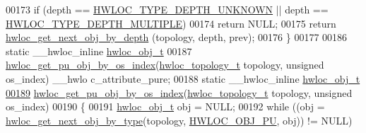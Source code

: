 \begin{DoxyCode}
00173   \textcolor{keywordflow}{if} (depth == \hyperlink{a00046_ggaf4e663cf42bbe20756b849c6293ef575a0565ab92ab72cb0cec91e23003294aad}{HWLOC_TYPE_DEPTH_UNKNOWN} || depth == \hyperlink{a00046_ggaf4e663cf42bbe20756b849c6293ef575ae99465995cacde6c210d5fc2e409798c}{HWLOC_TYPE_DEPTH_MULTIPLE})
00174     \textcolor{keywordflow}{return} NULL;
00175   \textcolor{keywordflow}{return} \hyperlink{a00053_gab7c1dce3f42ece5bfa621e87cf332418}{hwloc_get_next_obj_by_depth} (topology, depth, prev);
00176 \}
00177 
00186 \textcolor{keyword}{static} \_\_hwloc\_inline \hyperlink{a00016}{hwloc_obj_t}
00187 \hyperlink{a00053_ga0bc54225b65d557c70c7cb5dfb714de7}{hwloc_get_pu_obj_by_os_index}(\hyperlink{a00039_ga9d1e76ee15a7dee158b786c30b6a6e38}{hwloc_topology_t} topology, \textcolor{keywordtype}{unsigned} os\_index) \_\_hwlo
      c\_attribute\_pure;
00188 \textcolor{keyword}{static} \_\_hwloc\_inline \hyperlink{a00016}{hwloc_obj_t}
\hypertarget{a00031_source_l00189}{}\hyperlink{a00053_ga0bc54225b65d557c70c7cb5dfb714de7}{00189} \hyperlink{a00053_ga0bc54225b65d557c70c7cb5dfb714de7}{hwloc_get_pu_obj_by_os_index}(\hyperlink{a00039_ga9d1e76ee15a7dee158b786c30b6a6e38}{hwloc_topology_t} topology, \textcolor{keywordtype}{unsigned} os\_index)
00190 \{
00191   \hyperlink{a00016}{hwloc_obj_t} obj = NULL;
00192   \textcolor{keywordflow}{while} ((obj = \hyperlink{a00053_ga5f08ceb69375341e73563cfe2e77534e}{hwloc_get_next_obj_by_type}(topology, \hyperlink{a00041_ggacd37bb612667dc437d66bfb175a8dc55abca6887e80cb291353b0a0c1da83f661}{HWLOC_OBJ_PU}, obj)) != NULL)
      

\end{DoxyCode}

